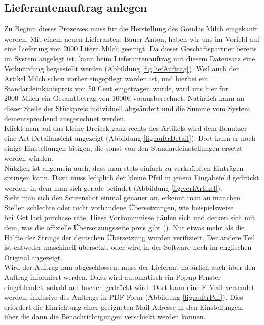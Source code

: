 \subsection{Lieferantenauftrag anlegen}
Zu Beginn dieses Prozesses muss für die Herstellung des Goudas Milch eingekauft werden. Mit einem neuen Lieferanten, Bauer Anton, haben wir uns im Vorfeld auf eine Lieferung von 2000 Litern Milch geeinigt. Da dieser Geschäftspartner bereits im System angelegt ist, kann beim Lieferantenauftrag mit diesem Datensatz eine Verknüpfung hergestellt werden (\vgl Abbildung \ref{fig:liefAuftrag}). Weil auch der Artikel Milch schon vorher eingepflegt worden ist, und hierbei ein Standardeinkaufspreis von 50 Cent eingetragen wurde, wird uns hier für 2000\ell\ Milch ein Gesamtbetrag von 1000€ vorausberechnet. Natürlich kann an dieser Stelle der Stückpreis individuell abgeändert und die Summe vom System dementsprechend ausgerechnet werden. \\
Klickt man auf das kleine Dreieck ganz rechts des Artikels wird dem Benutzer eine Art Detailansicht angezeigt (\vgl Abbildung \ref{fig:auftrDetail}). Dort kann er noch einige Einstellungen tätigen, die sonst von den Standardeinstellungen ersetzt werden würden. \\
Nützlich ist allgemein auch, dass man stets einfach zu verknüpften Einträgen springen kann. Dazu muss lediglich der kleine Pfeil in jenem Eingabefeld gedrückt werden, in dem man sich gerade befindet (\vgl Abbildung \ref{fig:verlArtikel}).\\
Sieht man sich den Screenshot einmal genauer an, erkennt man an manchen Stellen schlechte oder nicht vorhandene Übersetzungen, wie beispielsweise bei\ \glqq Get last purchase rate\grqq. Diese Vorkommnisse häufen sich und decken sich mit dem, was die offizielle Übersetzungsseite preis gibt (\vgl \cite{ERPNextTranslate}). Nur etwas mehr als die Hälfte der Strings der deutschen Übersetzung wurden verifiziert. Der andere Teil ist entweder maschinell übersetzt, oder wird in der Software noch im englischen Original angezeigt. \\
Wird der Auftrag nun abgeschlossen, muss der Lieferant natürlich auch über den Auftrag informiert werden. Dazu wird automatisch ein Popup-Fenster eingeblendet, sobald auf buchen gedrückt wird. Dort kann eine E-Mail versendet werden, inklusive des Auftrags in PDF-Form (\vgl Abbildung \ref{fig:auftrPdf}). Dies erfordert die Einrichtung einer geeigneten Mail-Adresse in den Einstellungen, über die dann die Benachrichtigungen verschickt werden können.

